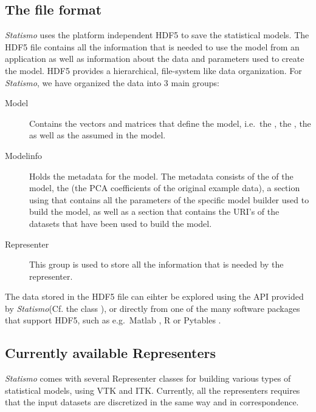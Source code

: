 \documentclass{InsightArticle}
\newcommand{\Statismo}{\emph{Statismo}\xspace}
\begin{document}
\subsection{The file format}
\Statismo uses the platform independent HDF5 \cite{hdf5} to save the
statistical models. The HDF5 file contains all the information that is
needed to use the model from an application as well as information
about the data and parameters used to create the model.  HDF5 provides
a hierarchical, file-system like data organization. 
For \Statismo, we have organized the data into  3 main groups:
\begin{description}
  \item [Model] Contains the vectors and matrices that define the model, i.e.\ the , the , the  as well 
    as the  assumed in the model. 
  \item [Modelinfo] Holds the metadata for the model. The metadata
    consists of the  of the model, the  (the
    PCA coefficients of the original example data), a section using 
     that contains all the parameters of the specific model builder used to build the model, as well as a section  that contains the URI's of the datasets that have been used to build the model. 
  \item [Representer]
    This group is used to store all the information that is needed by the representer. 
 \end{description}
 The data stored in the HDF5 file can eihter be explored using the API provided by \Statismo (Cf. the class ), or directly 
 from one of the many software packages that support HDF5, such as e.g.\ Matlab \cite{matlab}, R \cite{R} or Pytables \cite{pytables}.

\subsection{Currently available Representers}
\Statismo comes with several Representer classes for building various types of statistical models, using VTK and ITK. 
Currently, all the representers requires that the input datasets are discretized in the same way and in correspondence.
\end{document}
